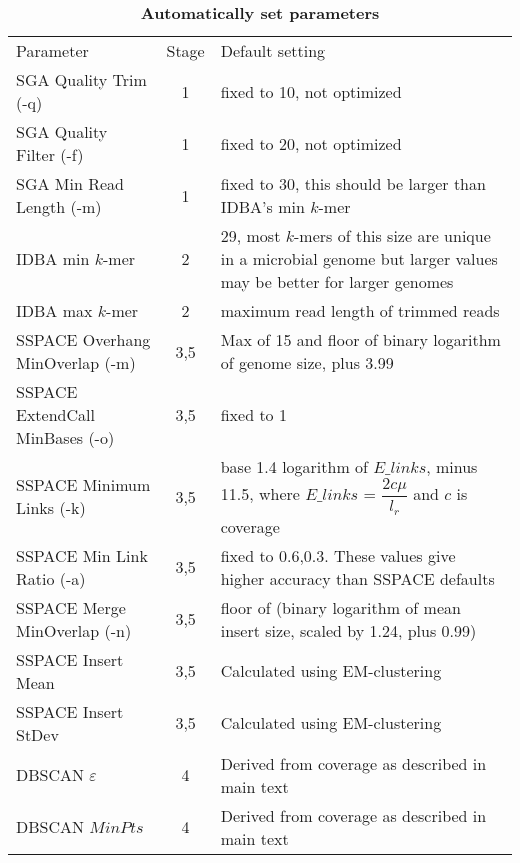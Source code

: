 \documentclass[10pt]{article}
\begin{document}
\clearpage

\renewcommand{\thetable}{S\arabic{table}}

\setcounter{table}{0}

\begin{table}[hp]
\caption{\bf{Automatically set parameters}}
\footnotesize
{\begin{tabular}{l|c|l}
Parameter                       & Stage & Default setting  \\
SGA Quality Trim (-q)           & 1     & fixed to 10, not optimized \\
SGA Quality Filter (-f)         & 1     & fixed to 20, not optimized \\
SGA Min Read Length (-m)        & 1     & fixed to 30, this should be larger than IDBA's min $k$-mer \\
IDBA min $k$-mer                & 2     & 29, most $k$-mers of this size are unique in a microbial genome but larger values may be better for larger genomes \\
IDBA max $k$-mer                & 2     & maximum read length of trimmed reads \\
SSPACE Overhang MinOverlap (-m) & 3,5   & Max of 15 and floor of binary logarithm of genome size, plus 3.99  \\
SSPACE ExtendCall MinBases (-o) & 3,5   & fixed to 1 \\
SSPACE Minimum Links (-k)       & 3,5   & base 1.4 logarithm of $E\_links$, minus 11.5, where $E\_links$ = $\dfrac{2c\mu}{l_r}$ and $c$ is coverage \\
SSPACE Min Link Ratio (-a)      & 3,5   & fixed to 0.6,0.3. These values give higher accuracy than SSPACE defaults  \\
SSPACE Merge MinOverlap (-n)    & 3,5   & floor of (binary logarithm of mean insert size, scaled by 1.24, plus 0.99) \\
SSPACE Insert Mean 	        & 3,5   & Calculated using EM-clustering \\
SSPACE Insert StDev             & 3,5   & Calculated using EM-clustering \\
DBSCAN $\varepsilon$            & 4     & Derived from coverage as described in main text \\
DBSCAN $MinPts$                 & 4     & Derived from coverage as described in main text \\
\end{tabular}}
\label{tab:tab03}
\end{table}
\end{document}
